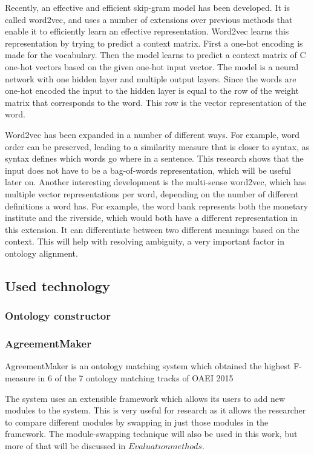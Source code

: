 \documentclass{article}
\begin{document}
 Recently, an effective and efficient skip-gram model has been developed. It is called word2vec, and uses a number of extensions over previous methods that enable it to efficiently learn an effective representation.
  Word2vec learns this representation by trying to predict a context matrix. First a one-hot encoding is made for the vocabulary. Then the model learns to predict a context matrix of C one-hot vectors based on the given one-hot input vector. The model is a neural network with one hidden layer and multiple output layers. Since the words are one-hot encoded the input to the hidden layer is equal to the row of the weight matrix that corresponds to the word. This row is the vector representation of the word.
 
 Word2vec has been expanded in a number of different ways. For example, word order can be preserved, leading to a similarity measure that is closer to syntax, as syntax defines which words go where in a sentence. This research shows that the input does not have to be a bag-of-words representation, which will be useful later on. %
 Another interesting development is the multi-sense word2vec, which has multiple vector representations per word, depending on the number of different definitions a word has. For example, the word bank represents both the monetary institute and the riverside, which would both have a different representation in this extension. It can differentiate between two different meanings based on the context. This will help with resolving ambiguity, a very important factor in ontology alignment.
 \subsection{Used technology}
 \subsubsection{Ontology constructor}
 \subsubsection{AgreementMaker}
 AgreementMaker is an ontology matching system which obtained the highest F-measure in 6 of the 7 ontology matching tracks of OAEI 2015 %
 
 The system uses an extensible framework which allows its users to add new modules to the system. This is very useful for research as it allows the researcher to compare different modules by swapping in just those modules in the framework. The module-swapping technique will also be used in this work, but more of that will be discussed in $Evaluation methods$.
\end{document}
